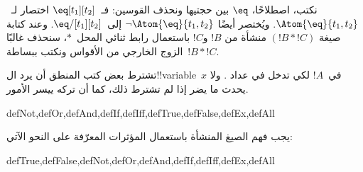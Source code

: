 \documentclass[../../../include/open-logic-section]{subfiles}
\begin{document}
نكتب، اصطلاحًا، $\eq$ بين حجتيها ونحذف القوسين:
فـ~$\eq[t_1][t_2]$ اختصار لـ~$\Atom{\eq}{t_1,t_2}$. ويُختصر أيضًا
$\lnot \Atom{\eq}{t_1,t_2}$ إلى~$\eq/[t_1][t_2]$. وعند كتابة صيغة
$(!B \ast !C)$ منشأة من $!B$ و$!C$ باستعمال رابط ثنائي
المحل~$\ast$، سنحذف غالبًا الزوج الخارجي من الأقواس ونكتب
ببساطة~$!B \ast !C$.

\begin{intro}
تشترط بعض كتب المنطق أن يرد ال!!{variable}~$x$ في~$!A$ لكي تدخل
%
%
%
في عداد
.
ولا يحدث ما يضر إذا لم تشترط ذلك، كما أن تركه ييسر الأمور.
\end{intro}

\begin{tagblock}{defNot,defOr,defAnd,defIf,defIff,defTrue,defFalse,defEx,defAll}
\begin{defn}
يجب فهم الصيغ المنشأة باستعمال المؤثرات المعرّفة على النحو الآتي:

\begin{tagenumerate}{defTrue,defFalse,defNot,defOr,defAnd,defIf,defIff,defEx,defAll}









\end{tagenumerate}
\end{defn}
\end{tagblock}
\end{document}
